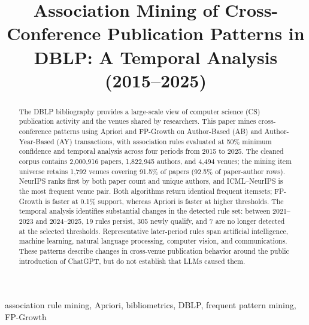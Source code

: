 \documentclass[conference]{IEEEtran}
\begin{document}
\title{Association Mining of Cross-Conference Publication Patterns in DBLP: A Temporal Analysis (2015--2025)}

\author{
\and
{}
}

\maketitle

\begin{abstract}
The DBLP bibliography provides a large-scale view of computer science (CS) publication activity and the venues shared by researchers. This paper mines cross-conference patterns using Apriori and FP-Growth on Author-Based (AB) and Author-Year-Based (AY) transactions, with association rules evaluated at 50\% minimum confidence and temporal analysis across four periods from 2015 to 2025. The cleaned corpus contains 2,000,916 papers, 1,822,945 authors, and 4,494 venues; the mining item universe retains 1,792 venues covering 91.5\% of papers (92.5\% of paper-author rows). NeurIPS ranks first by both paper count and unique authors, and ICML--NeurIPS is the most frequent venue pair. Both algorithms return identical frequent itemsets; FP-Growth is faster at 0.1\% support, whereas Apriori is faster at higher thresholds. The temporal analysis identifies substantial changes in the detected rule set: between 2021--2023 and 2024--2025, 19 rules persist, 305 newly qualify, and 7 are no longer detected at the selected thresholds. Representative later-period rules span artificial intelligence, machine learning, natural language processing, computer vision, and communications. These patterns describe changes in cross-venue publication behavior around the public introduction of ChatGPT, but do not establish that LLMs caused them.
\end{abstract}

\begin{IEEEkeywords}
association rule mining, Apriori, bibliometrics, DBLP, frequent pattern mining, FP-Growth
\end{IEEEkeywords}
\end{document}
